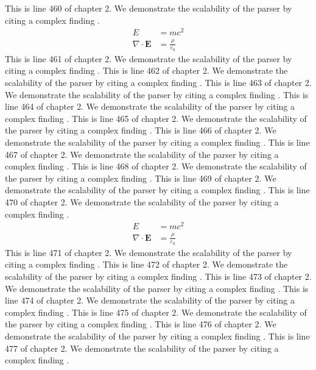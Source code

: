 This is line 460 of chapter 2. We demonstrate the scalability of the parser by citing a complex finding \cite{ref2_460}.
\begin{align*}
  E &= mc^2 \\
  \nabla \cdot \mathbf{E} &= \frac{\rho}{\varepsilon_0}
\end{align*}
This is line 461 of chapter 2. We demonstrate the scalability of the parser by citing a complex finding \cite{ref2_461}.
This is line 462 of chapter 2. We demonstrate the scalability of the parser by citing a complex finding \cite{ref2_462}.
This is line 463 of chapter 2. We demonstrate the scalability of the parser by citing a complex finding \cite{ref2_463}.
This is line 464 of chapter 2. We demonstrate the scalability of the parser by citing a complex finding \cite{ref2_464}.
This is line 465 of chapter 2. We demonstrate the scalability of the parser by citing a complex finding \cite{ref2_465}.
This is line 466 of chapter 2. We demonstrate the scalability of the parser by citing a complex finding \cite{ref2_466}.
This is line 467 of chapter 2. We demonstrate the scalability of the parser by citing a complex finding \cite{ref2_467}.
This is line 468 of chapter 2. We demonstrate the scalability of the parser by citing a complex finding \cite{ref2_468}.
This is line 469 of chapter 2. We demonstrate the scalability of the parser by citing a complex finding \cite{ref2_469}.
This is line 470 of chapter 2. We demonstrate the scalability of the parser by citing a complex finding \cite{ref2_470}.
\begin{align*}
  E &= mc^2 \\
  \nabla \cdot \mathbf{E} &= \frac{\rho}{\varepsilon_0}
\end{align*}
This is line 471 of chapter 2. We demonstrate the scalability of the parser by citing a complex finding \cite{ref2_471}.
This is line 472 of chapter 2. We demonstrate the scalability of the parser by citing a complex finding \cite{ref2_472}.
This is line 473 of chapter 2. We demonstrate the scalability of the parser by citing a complex finding \cite{ref2_473}.
This is line 474 of chapter 2. We demonstrate the scalability of the parser by citing a complex finding \cite{ref2_474}.
This is line 475 of chapter 2. We demonstrate the scalability of the parser by citing a complex finding \cite{ref2_475}.
This is line 476 of chapter 2. We demonstrate the scalability of the parser by citing a complex finding \cite{ref2_476}.
This is line 477 of chapter 2. We demonstrate the scalability of the parser by citing a complex finding \cite{ref2_477}.
